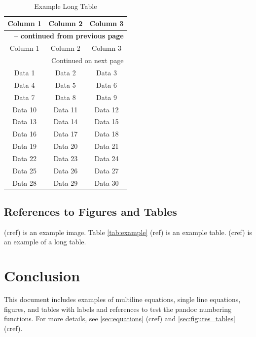 \documentclass{article}
\begin{document}
\begin{longtable}{|c|c|c|}
    \caption{Example Long Table}  \label{tab:longtable}\\
    \hline
    Column 1 & Column 2 & Column 3 \\
    \hline
    \endfirsthead
    \multicolumn{3}{c}{{\bfseries \tablename\ \thetable{} -- continued from previous page}} \\
    \hline
    Column 1 & Column 2 & Column 3 \\
    \hline
    \endhead
    \hline \multicolumn{3}{|r|}{{Continued on next page}} \\ \hline
    \endfoot
    \hline
    \endlastfoot
    Data 1 & Data 2 & Data 3 \\
    Data 4 & Data 5 & Data 6 \\
    Data 7 & Data 8 & Data 9 \\
    Data 10 & Data 11 & Data 12 \\
    Data 13 & Data 14 & Data 15 \\
    Data 16 & Data 17 & Data 18 \\
    Data 19 & Data 20 & Data 21 \\
    Data 22 & Data 23 & Data 24 \\
    Data 25 & Data 26 & Data 27 \\
    Data 28 & Data 29 & Data 30 \\
\end{longtable}

\subsection{References to Figures and Tables}
 (cref) is an example image. Table \ref{tab:example} (ref) is an example table.  (cref) is an example of a long table.

\section{Conclusion}
This document includes examples of multiline equations, single line equations, figures, and tables with labels and references to test the pandoc numbering functions. For more details, see \cref{sec:equations} (cref) and \cref{sec:figures_tables} (cref).
\end{document}
